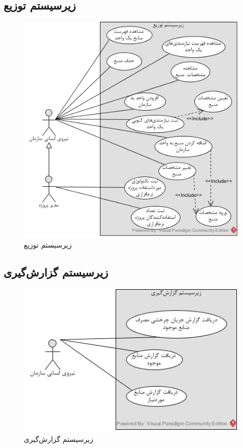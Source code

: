 \subsection{زیرسیستم توزیع}
\begin{figure}[H]
	\centering
	\includegraphics[scale=0.8]{img/usecase/tozi}
	\caption{زیرسیستم توزیع}
\end{figure}

\subsection{زیرسیستم گزارش‌گیری}
\begin{figure}[H]
	\centering
	\includegraphics[scale=1]{img/usecase/report}
	\caption{زیرسیستم گزارش‌گیری}
\end{figure}

